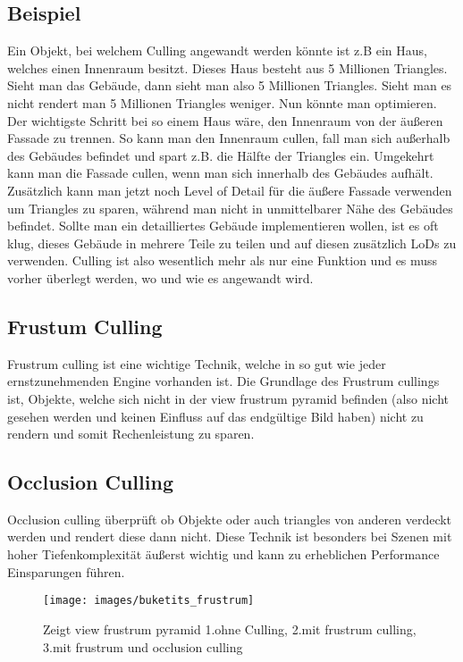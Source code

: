 \subsection{Beispiel}
Ein Objekt, bei welchem Culling angewandt werden könnte ist z.B ein Haus, welches einen Innenraum besitzt. Dieses Haus besteht aus 5 Millionen Triangles. Sieht man das Gebäude, dann sieht man also 5 Millionen Triangles. Sieht man es nicht rendert man 5 Millionen Triangles weniger. Nun könnte man optimieren.
Der wichtigste Schritt bei so einem Haus wäre, den Innenraum von der äußeren Fassade zu trennen. So kann man den Innenraum cullen, fall man sich außerhalb des Gebäudes befindet und spart z.B. die Hälfte der Triangles ein. Umgekehrt kann man die Fassade cullen, wenn man sich innerhalb des Gebäudes aufhält.
Zusätzlich kann man jetzt noch Level of Detail für die äußere Fassade verwenden um Triangles zu sparen, während man nicht in unmittelbarer Nähe des Gebäudes befindet. Sollte man ein detailliertes Gebäude implementieren wollen, ist es oft klug, dieses Gebäude in mehrere Teile zu teilen und auf diesen zusätzlich LoDs zu verwenden. Culling ist also wesentlich mehr als nur eine Funktion und es muss vorher überlegt werden, wo und wie es angewandt wird.

\cite{_cryengine_culling}

\subsection{Frustum Culling}
Frustrum culling ist eine wichtige Technik, welche in so gut wie jeder ernstzunehmenden Engine vorhanden ist. Die Grundlage des Frustrum cullings ist, Objekte, welche sich nicht in der view frustrum pyramid befinden (also nicht gesehen werden und keinen Einfluss auf das endgültige Bild haben) nicht zu rendern und somit Rechenleistung zu sparen.
\cite{_cryengine_culling}

\subsection{Occlusion Culling}
Occlusion culling überprüft ob Objekte oder auch triangles von anderen verdeckt werden und rendert diese dann nicht. Diese Technik ist besonders bei Szenen mit hoher Tiefenkomplexität äußerst wichtig und kann zu erheblichen Performance Einsparungen führen.
\cite{_cryengine_culling}

\begin{figure}[h]
	\centering
	\texttt{[image: images/buketits\_frustrum]}
	\caption{Zeigt view frustrum pyramid 1.ohne Culling, 2.mit frustrum culling, 3.mit frustrum und occlusion culling\cite{_culling}}
\end{figure}

